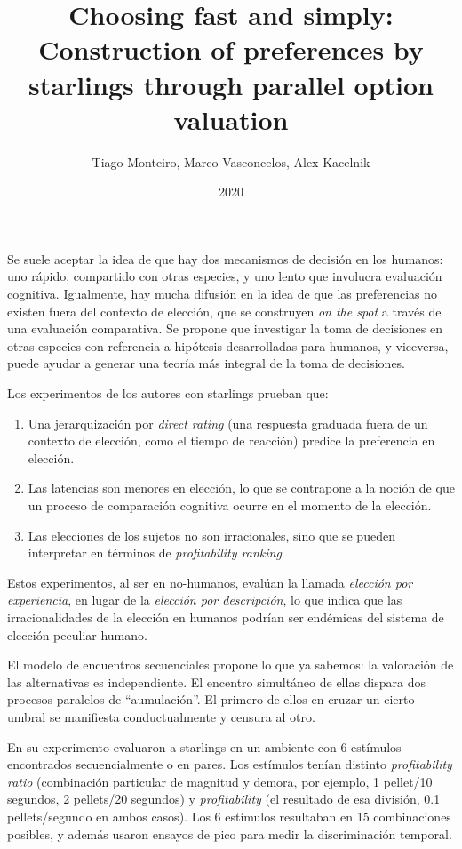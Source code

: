 \documentclass[a4paper,12pt]{article}
\title{Choosing fast and simply: Construction of  preferences by starlings through parallel option valuation}
\author{Tiago Monteiro, Marco Vasconcelos, Alex Kacelnik}
\date{2020}
\begin{document}
{\scshape\bfseries \maketitle}

Se suele aceptar la idea de que hay dos mecanismos de decisión en los humanos: uno rápido, compartido con otras especies, y uno lento que involucra evaluación cognitiva. Igualmente, hay mucha difusión en la idea de que las preferencias no existen fuera del contexto de elección, que se construyen {\slshape on the spot} a través de una evaluación comparativa. Se propone que investigar la toma de decisiones en otras especies con referencia a hipótesis desarrolladas para humanos, y viceversa, puede ayudar a generar una teoría más integral de la toma de decisiones.

Los experimentos de los autores con starlings prueban que:
\begin{enumerate}
	\item Una jerarquización por {\slshape direct rating} (una respuesta graduada fuera de un contexto de elección, como el tiempo de reacción) predice la preferencia en elección.
	\item Las latencias son menores en elección, lo que se contrapone a la noción de que un proceso de comparación cognitiva ocurre en el momento de la elección.
	\item Las elecciones de los sujetos no son irracionales, sino que se pueden interpretar en términos de {\slshape profitability ranking}.
\end{enumerate}

Estos experimentos, al ser en no-humanos, evalúan la llamada {\slshape elección por experiencia}, en lugar de la {\slshape elección por descripción}, lo que indica que las irracionalidades de la elección en humanos podrían ser endémicas del sistema de elección peculiar humano.

El modelo de encuentros secuenciales propone lo que ya sabemos: la valoración de las alternativas es independiente. El encentro simultáneo de ellas dispara dos procesos paralelos de ``aumulación''. El primero de ellos en cruzar un cierto umbral se manifiesta conductualmente y censura al otro.

En su experimento evaluaron a starlings en un ambiente con 6 estímulos encontrados secuencialmente o en pares. Los estímulos tenían distinto {\slshape profitability ratio} (combinación particular de magnitud y demora, por ejemplo, 1 pellet/10 segundos, 2 pellets/20 segundos) y {\slshape profitability} (el resultado de esa división, 0.1 pellets/segundo en ambos casos). Los 6 estímulos resultaban en 15 combinaciones posibles, y además usaron ensayos de pico para medir la discriminación temporal.
\end{document}

